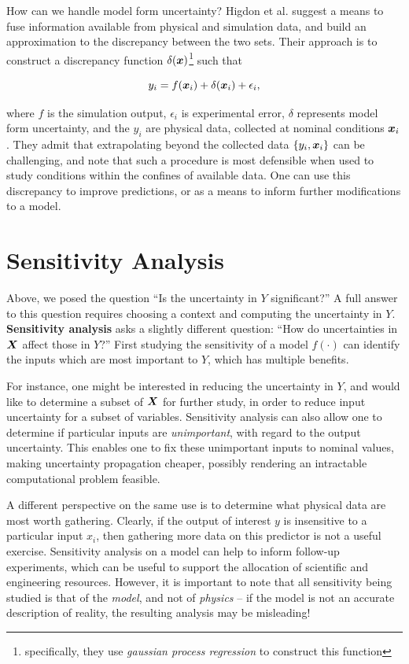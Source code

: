 \documentclass[../primer.tex]{subfiles}
\begin{document}
How can we handle model form uncertainty? Higdon et
al.\cite{higdon2004calibration-prediction} suggest a means to fuse information
available from physical and simulation data, and build an approximation to the
discrepancy between the two sets. Their approach is to construct a discrepancy
function $\delta(\boldsymbol{x})$\footnote{specifically, they use \emph{gaussian process
    regression} to construct this function} such that

\begin{equation}
  y_i = f(\boldsymbol{x}_i) + \delta(\boldsymbol{x}_i) + \epsilon_i,
\end{equation}

\noindent where $f$ is the simulation output, $\epsilon_i$ is experimental
error, $\delta$ represents model form uncertainty, and the $y_i$ are physical
data, collected at nominal conditions $\boldsymbol{x}_i$. They admit that extrapolating
beyond the collected data $\{y_i,\boldsymbol{x}_i\}$ can be challenging, and note that such
a procedure is most defensible when used to study conditions within the confines
of available data. One can use this discrepancy to improve predictions, or as a
means to inform further modifications to a model.\cite{joseph2015engineering}

\section{Sensitivity Analysis} \label{sec:sa}
Above, we posed the question ``Is the uncertainty in $Y$ significant?'' A full
answer to this question requires choosing a context and computing the
uncertainty in $Y$. \textbf{Sensitivity analysis} asks a slightly different
question: ``How do uncertainties in $\boldsymbol{X}$ affect those in $Y$?'' First studying
the sensitivity of a model $f(\cdot)$ can identify the inputs which are most
important to $Y$, which has multiple benefits.

For instance, one might be interested in reducing the uncertainty in $Y$, and
would like to determine a subset of $\boldsymbol{X}$ for further study, in order to reduce
input uncertainty for a subset of variables. Sensitivity analysis can also allow
one to determine if particular inputs are \emph{unimportant}, with regard to the
output uncertainty. This enables one to fix these unimportant inputs to nominal
values, making uncertainty propagation cheaper, possibly rendering an
intractable computational problem feasible.

A different perspective on the same use is to determine what physical data are
most worth gathering. Clearly, if the output of interest $y$ is insensitive to a
particular input $x_i$, then gathering more data on this predictor is not a
useful exercise. Sensitivity analysis on a model can help to inform follow-up
experiments, which can be useful to support the allocation of scientific and
engineering resources. However, it is important to note that all sensitivity
being studied is that of the \emph{model}, and not of \emph{physics} -- if the
model is not an accurate description of reality, the resulting analysis may be
misleading!
\end{document}
